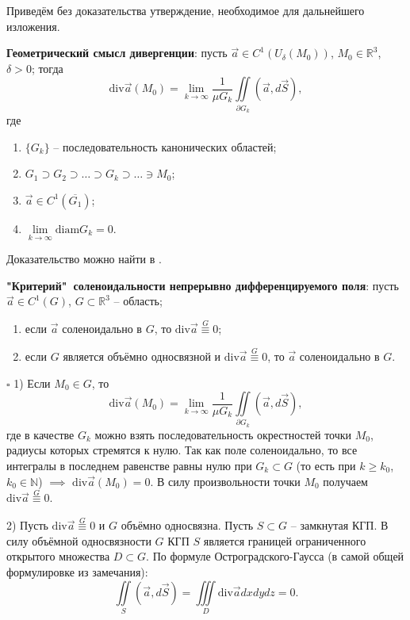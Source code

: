 \documentclass[12pt, a4paper, reqno]{article}
\begin{document}
    Приведём без доказательства утверждение, необходимое для дальнейшего изложения.

    \textbf{Геометрический смысл дивергенции}: пусть $\vec{a} \in C^1(U_{\delta}(M_0))$,
    $M_0 \in \mathbb{R}^3$, $\delta > 0$; тогда
    \begin{equation*}
        \text{div}\vec{a}(M_0) =
        \lim\limits_{k \to \infty} \frac{1}{\mu G_k} \iint\limits_{\partial G_k} (\vec{a}, d\vec{S}),
    \end{equation*}
    где
    \begin{enumerate}
        \item $\{G_k\}$ -- последовательность канонических областей;
        \item $G_1 \supset G_2 \supset \ldots \supset G_k \supset \ldots \ni M_0$;
        \item $\vec{a} \in C^1(\overline{G_1})$;
        \item $\lim\limits_{k \to \infty} \text{diam}G_k = 0$.
    \end{enumerate}

    Доказательство можно найти в \cite{petrovich-3}.

    \textbf{"Критерий"\ соленоидальности непрерывно дифференцируемого поля}: пусть $\vec{a} \in C^1(G)$,
    $G \subset \mathbb{R}^3$ -- область;
    \begin{enumerate}
        \item если $\vec{a}$ соленоидально в $G$, то $\text{div} \vec{a} \overset{G}{\equiv} 0$;
        \item если $G$ является объёмно односвязной и $\text{div} \vec{a} \overset{G}{\equiv} 0$,
              то $\vec{a}$ соленоидально в $G$.
    \end{enumerate}

    $\square$
    1) Если $M_0 \in G$, то
    \begin{equation*}
        \text{div} \vec{a}(M_0) =
        \lim\limits_{k \to \infty} \frac{1}{\mu G_k} \iint\limits_{\partial G_k}(\vec{a}, d\vec{S}),
    \end{equation*}
    где в качестве $G_k$ можно взять последовательность окрестностей точки $M_0$, радиусы которых
    стремятся к нулю. Так как поле соленоидально, то все интегралы в последнем равенстве равны нулю
    при $G_k \subset G$ (то есть при $k \geq k_0$, $k_0 \in \mathbb{N}$) $\implies$
    $\text{div} \vec{a}(M_0) = 0$. В силу произвольности точки $M_0$ получаем
    $\text{div} \vec{a} \overset{G}{\equiv} 0$.

    2) Пусть $\text{div} \vec{a} \overset{G}{\equiv} 0$ и $G$ объёмно односвязна. Пусть $S \subset G$ --
    замкнутая КГП. В силу объёмной односвязности $G$ КГП $S$ является границей ограниченного
    открытого множества $D \subset G$. По формуле Остроградского-Гаусса (в самой общей формулировке
    из замечания):
    \begin{equation*}
        \iint\limits_{S} (\vec{a}, d\vec{S}) = \iiint\limits_{D} \text{div} \vec{a} dx dy dz = 0.
    \end{equation*}
\end{document}
